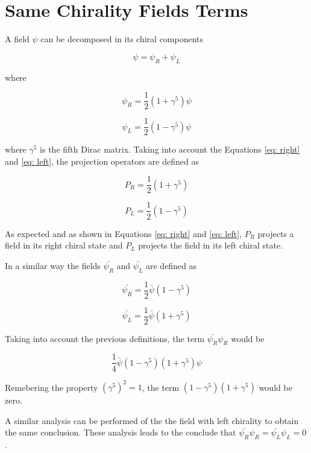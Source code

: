 \chapter{Same Chirality Fields Terms} \label{app: samechirality}

A field $\psi$ can be decomposed in its chiral components

$$ \psi = \psi_{R} + \psi_{L} $$

where 

\begin{equation}\label{eq: right}
\psi_{R} = \frac{1}{2}\left(1 + \gamma^{5}\right)\psi
\end{equation}

\begin{equation}\label{eq: left}
\psi_{L} = \frac{1}{2}\left(1 - \gamma^{5}\right)\psi
\end{equation}

where $\gamma^{5}$ is the fifth Dirac matrix. Taking into account the Equations \ref{eq: right} and \ref{eq: left}, the projection operators are defined as

$$P_{R} = \frac{1}{2}\left(1 + \gamma^{5}\right)$$

$$P_{L} = \frac{1}{2}\left(1 - \gamma^{5}\right)$$

As expected and as shown in Equations \ref{eq: right} and \ref{eq: left}, $P_{R}$ projects a field in its right chiral state and $P_{L}$ projects the field in its left chiral state.


In a similar way the fields $\bar{\psi_{R}}$ and $\bar{\psi_{L}}$ are defined as  

$$ \bar{\psi_{R}} = \frac{1}{2}\bar{\psi}\left(1 - \gamma^{5}\right) $$

$$ \bar{\psi_{L}} = \frac{1}{2}\bar{\psi}\left(1 + \gamma^{5}\right) $$

Taking into account the previous definitions, the term $\bar{\psi_{R}}\psi_{R}$ would be

$$\frac{1}{4}\bar{\psi}\left(1 - \gamma^{5}\right)\left(1+\gamma^{5}\right)\psi$$

Remebering the property $\left(\gamma^{5}\right)^{2} = 1$, the term $\left(1 - \gamma^{5}\right)\left(1+\gamma^{5}\right)$ would be zero.

A similar analysis can be performed of the the field with left chirality to obtain the same conclusion. These analysis leads to the conclude that $\bar{\psi_{R}}\psi_{R} = \bar{\psi_{L}}\psi_{L} = 0$. 



